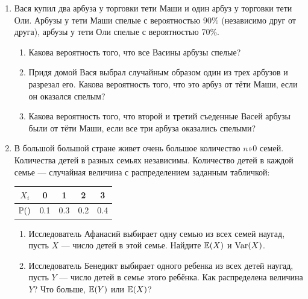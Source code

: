 \documentclass[12pt, a4paper]{article}\usepackage[]{graphicx}\usepackage[]{color}
\begin{document}
				\begin{enumerate}


					\item Вася купил два арбуза у торговки тети Маши и один арбуз у торговки тети Оли. Арбузы у тети Маши спелые с вероятностью 90\% (независимо друг от друга), арбузы у тети Оли спелые с вероятностью 70\%.

					\begin{enumerate}
						\item Какова вероятность того, что все Васины арбузы спелые?
						\item Придя домой Вася выбрал случайным образом один из трех арбузов и разрезал его. Какова вероятность того, что это арбуз от тёти Маши, если он оказался спелым?
						\item Какова вероятность того, что второй и третий съеденные Васей арбузы были от тёти Маши, если все три арбуза оказались спелыми?
					\end{enumerate}


					\item В большой большой стране живет очень большое количество $n»0$ семей. Количества детей в разных семьях независимы. Количество детей в каждой семье — случайная величина с распределением заданным табличкой:


					\begin{tabular}{ccccc}
						$X_i$ & 0 & 1 & 2 & 3 \\
						\hline
						$\P()$ & 0.1 & 0.3 & 0.2 & 0.4 \\
					\end{tabular}

					\begin{enumerate}
						\item Исследователь Афанасий выбирает одну семью из всех семей наугад, пусть $X$ — число детей в этой семье. Найдите $\E(X)$ и $\Var(X)$.
						\item Исследователь Бенедикт выбирает одного ребенка из всех детей наугад, пусть $Y$ — число детей в семье этого ребёнка. Как распределена величина $Y$? Что больше, $\E(Y)$ или $\E(X)$?
					\end{enumerate}


\end{enumerate}
\end{document}
